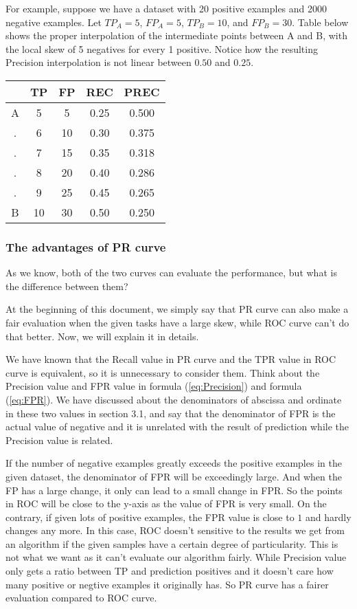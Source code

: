 \documentclass[a4paper,12pt]{article}
\begin{document}
\begin{enumerate}
For example, suppose we have a dataset with 20 positive examples and 2000 negative examples. Let $TP_A=5$, $FP_A=5$, $TP_B=10$, and $FP_B=30$. Table below  shows the proper interpolation of the intermediate points between A and B, with the local skew of 5 negatives for every 1 positive. Notice how the resulting Precision interpolation is not linear between $0.50$ and $0.25$.
\begin{center}
\begin{tabular}{|c|c|c|c|c|}
\hline
 &TP&FP&REC&PREC\\
\hline
A&5&5&0.25&0.500\\
.&6&10&0.30&0.375\\
.&7&15&0.35&0.318\\
.&8&20&0.40&0.286\\
.&9&25&0.45&0.265\\
B&10&30&0.50&0.250\\
\hline
\end{tabular}
\end{center}
 \end{enumerate}

\subsubsection{The advantages of PR curve}

As we know, both of the two curves can evaluate the performance, but what is the difference between them? 

At the beginning of this document, we simply say that PR curve can also make a fair evaluation when the given tasks have a large skew, while ROC curve can't do that better. Now, we will explain it in details.

We have known that the Recall value in PR curve and the TPR value in ROC curve is equivalent, so it is unnecessary to consider them. Think about the Precision value and FPR value in formula (\ref{eq:Precision}) and formula (\ref{eq:FPR}). We have discussed about the denominators of abscissa and ordinate in these two values in section 3.1, and say that the denominator of FPR is the actual value of negative and it is unrelated with the result of prediction while the Precision value is related.

If the number of negative examples greatly exceeds the positive examples in the given dataset, the denominator of FPR will be exceedingly large. And when the FP has a large change, it only can lead to a small change in FPR. So the points in ROC will be close to the y-axis as the value of FPR is very small. On the contrary, if given lots of positive examples, the FPR value is close to $1$ and hardly changes any more. In this case, ROC doesn't sensitive to the results we get from an algorithm if the given samples have a certain degree of particularity. This is not what we want as it can't evaluate our algorithm fairly. While Precision value only gets a ratio between TP and prediction positives and it doesn't care how many positive or negtive examples it originally has. So PR curve has a fairer evaluation compared to ROC curve.
\end{document}
